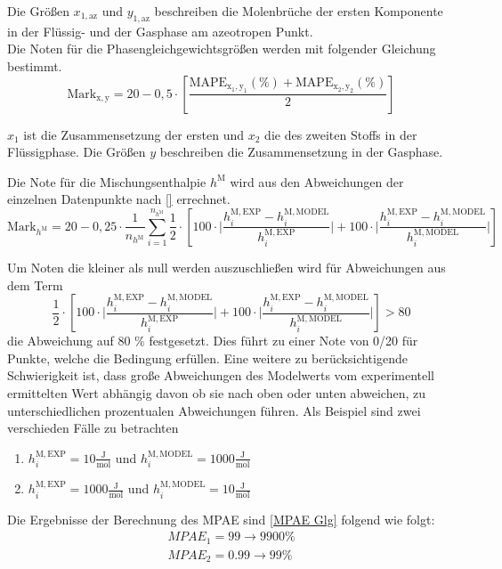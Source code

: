 \documentclass[../thesis.tex]{subfiles}
\begin{document}
Die Größen $ x_{1,\mathrm{az}} $ und $ y_{1,\mathrm{az}} $ beschreiben die Molenbrüche der ersten Komponente in der Flüssig- und der Gasphase am azeotropen Punkt.
\\

Die Noten für die Phasengleichgewichtsgrößen werden mit folgender Gleichung bestimmt.
\begin{equation}
	\mathrm{Mark}_{\mathrm{x,y}} = 20 - 0,5 \cdot \left[
		\dfrac{\mathrm{MAPE_{x_1,y_1}(\%)} + \mathrm{MAPE_{x_2,y_2}}(\%)}{2}
	\right]
\end{equation}

$x_1$ ist die Zusammensetzung der ersten und $x_2$ die des zweiten Stoffs in der Flüssigphase. Die Größen $ y $ beschreiben die Zusammensetzung in der Gasphase.

Die Note für die Mischungsenthalpie $ h^{\mathrm{M}} $ wird aus den Abweichungen der einzelnen Datenpunkte nach \autoref{} errechnet.
\begin{equation}
\mathrm{Mark}_{h^{\mathrm{M}}} = 20 - 0,25 \cdot \dfrac{1}{n_{h^{\mathrm{M}}}} \sum_{i=1}^{n_{h^{\mathrm{M}}}}
	\dfrac{1}{2} \cdot \left[
		100 \cdot \biggl|
			\dfrac{h_i^{\mathrm{M,EXP}}-h_i^{\mathrm{M,MODEL}}}{h_i^{\mathrm{M,EXP}}} 
			\biggl| 
			+ 100 \cdot \biggl| \dfrac{h_i^{\mathrm{M,EXP}}-h_i^{\mathrm{M,MODEL}}}{h_i^{\mathrm{M,MODEL}}}
		\biggl|
	\right]
\end{equation}

Um Noten die kleiner als null werden auszuschließen wird für Abweichungen aus dem Term
\begin{equation}
	\label{eq: h_m MAPEs}
	\dfrac{1}{2} \cdot \left[
	100 \cdot \biggl|
	\dfrac{h_i^{\mathrm{M,EXP}}-h_i^{\mathrm{M,MODEL}}}{h_i^{\mathrm{M,EXP}}} 
	\biggl| 
	+ 100 \cdot \biggl| \dfrac{h_i^{\mathrm{M,EXP}}-h_i^{\mathrm{M,MODEL}}}{h_i^{\mathrm{M,MODEL}}}
	\biggl| \right] > 80
\end{equation}
die Abweichung auf 80 \% festgesetzt. Dies führt zu einer Note von 0/20 für Punkte, welche die Bedingung erfüllen. Eine weitere zu berücksichtigende Schwierigkeit ist, dass große Abweichungen des Modelwerts vom experimentell ermittelten Wert abhängig davon ob sie nach oben oder unten abweichen, zu unterschiedlichen prozentualen Abweichungen führen.
Als Beispiel sind zwei verschieden Fälle zu betrachten
\begin{enumerate}
	\item $ h_i^{\mathrm{M,EXP}} = 10 \mathrm{\frac{J}{mol}} $ und $ h_i^{\mathrm{M,MODEL}} = 1000 \mathrm{\frac{J}{mol}} $
	\item $ h_i^{\mathrm{M,EXP}} = 1000 \mathrm{\frac{J}{mol}} $ und $ h_i^{\mathrm{M,MODEL}} = 10 \mathrm{\frac{J}{mol}} $
\end{enumerate}
Die Ergebnisse der Berechnung des MPAE sind \autoref{MPAE Glg} folgend wie folgt:
\begin{eqnarray}
MPAE_1 = 99 \rightarrow 9900 \% \\
MPAE_2 = 0.99 \rightarrow 99 \%
\end{eqnarray}
\end{document}
